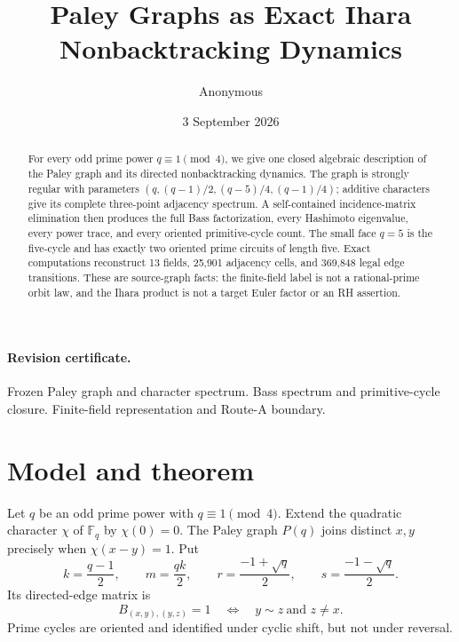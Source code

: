 \documentclass[10pt]{article}
\title{Paley Graphs as Exact Ihara Nonbacktracking Dynamics}
\author{Anonymous}
\date{3 September 2026}
\newcommand{\F}{\mathbb F}
\providecommand{\CRevisionRound}{2}
\begin{document}
\maketitle
\vspace{-1.4em}

\begin{abstract}
For every odd prime power $q\equiv1\pmod4$, we give one closed algebraic
description of the Paley graph and its directed nonbacktracking dynamics.  The
graph is strongly regular with parameters
$(q,(q-1)/2,(q-5)/4,(q-1)/4)$; additive characters give its complete
three-point adjacency spectrum.  A self-contained incidence-matrix
elimination then produces the full Bass factorization, every Hashimoto
eigenvalue, every power trace, and every oriented primitive-cycle count.  The
small face $q=5$ is the five-cycle and has exactly two oriented prime circuits
of length five.  Exact computations reconstruct 13 fields, 25,901 adjacency
cells, and 369,848 legal edge transitions.  These are source-graph facts: the
finite-field label is not a rational-prime orbit law, and the Ihara product is
not a target Euler factor or an RH assertion.
\end{abstract}

\paragraph{Revision certificate.}
\ifcase\CRevisionRound
Frozen Paley graph and character spectrum.
\or
Bass spectrum and primitive-cycle closure.
\else
Finite-field representation and Route-A boundary.
\fi

\section{Model and theorem}
Let $q$ be an odd prime power with $q\equiv1\pmod4$.  Extend the quadratic
character $\chi$ of $\F_q$ by $\chi(0)=0$.  The Paley graph $P(q)$ joins
distinct $x,y$ precisely when $\chi(x-y)=1$.  Put
\[
 k=\frac{q-1}{2},\qquad m=\frac{qk}{2},\qquad
 r=\frac{-1+\sqrt q}{2},\qquad s=\frac{-1-\sqrt q}{2}.
\]
Its directed-edge matrix is
\[
 B_{(x,y),(y,z)}=1\quad\Longleftrightarrow\quad y\sim z\ \text{and }z\ne x.
\]
Prime cycles are oriented and identified under cyclic shift, but not under
reversal.
\end{document}
